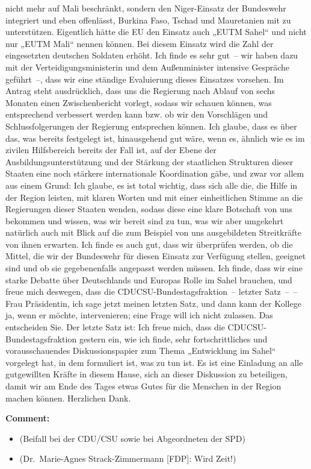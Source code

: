 \documentclass{article}
\begin{document}
nicht mehr auf Mali beschränkt, sondern den Niger-Einsatz der Bundeswehr integriert und eben offenlässt, Burkina Faso, Tschad und Mauretanien mit zu unterstützen. Eigentlich hätte die EU den Einsatz auch „EUTM Sahel“ und nicht nur „EUTM Mali“ nennen können. Bei diesem Einsatz wird die Zahl der eingesetzten deutschen Soldaten erhöht. Ich finde es sehr gut – wir haben dazu mit der Verteidigungsministerin und dem Außenminister intensive Gespräche geführt –, dass wir eine ständige Evaluierung dieses Einsatzes vorsehen.  Im Antrag steht ausdrücklich, dass uns die Regierung nach Ablauf von sechs Monaten einen Zwischenbericht vorlegt, sodass wir schauen können, was entsprechend verbessert werden kann bzw. ob wir den Vorschlägen und Schlussfolgerungen der Regierung entsprechen können. Ich glaube, dass es über das, was bereits festgelegt ist, hinausgehend gut wäre, wenn es, ähnlich wie es im zivilen Hilfsbereich bereits der Fall ist, auf der Ebene der Ausbildungsunterstützung und der Stärkung der staatlichen Strukturen dieser Staaten eine noch stärkere internationale Koordination gäbe, und zwar vor allem aus einem Grund: Ich glaube, es ist total wichtig, dass sich alle die, die Hilfe in der Region leisten, mit klaren Worten und mit einer einheitlichen Stimme an die Regierungen dieser Staaten wenden, sodass diese eine klare Botschaft von uns bekommen und wissen, was wir bereit sind zu tun, was wir aber umgekehrt natürlich auch mit Blick auf die zum Beispiel von uns ausgebildeten Streitkräfte von ihnen erwarten. Ich finde es auch gut, dass wir überprüfen werden, ob die Mittel, die wir der Bundeswehr für diesen Einsatz zur Verfügung stellen, geeignet sind und ob sie gegebenenfalls angepasst werden müssen. Ich finde, dass wir eine starke Debatte über Deutschlands und Europas Rolle im Sahel brauchen, und freue mich deswegen, dass die CDU\/CSU-Bundestagsfraktion – letzter Satz – – Frau Präsidentin, ich sage jetzt meinen letzten Satz, und dann kann der Kollege ja, wenn er möchte, intervenieren; eine Frage will ich nicht zulassen. Das entscheiden Sie. Der letzte Satz ist: Ich freue mich, dass die CDU\/CSU-Bundestagsfraktion gestern ein, wie ich finde, sehr fortschrittliches und vorausschauendes Diskussionspapier zum Thema „Entwicklung im Sahel“ vorgelegt hat, in dem formuliert ist, was zu tun ist. Es ist eine Einladung an alle gutgewillten Kräfte in diesem Hause, sich an dieser Diskussion zu beteiligen, damit wir am Ende des Tages etwas Gutes für die Menschen in der Region machen können. Herzlichen Dank. 

\noindent\textbf{Comment:}
\begin{itemize}
    \setlength\itemsep{-3pt}
    \item (Beifall bei der CDU/CSU sowie bei Abgeordneten der SPD)
    \setlength\itemsep{-3pt}
    \item (Dr. Marie-Agnes Strack-Zimmermann [FDP]: Wird Zeit!)
\end{itemize}
\end{document}
